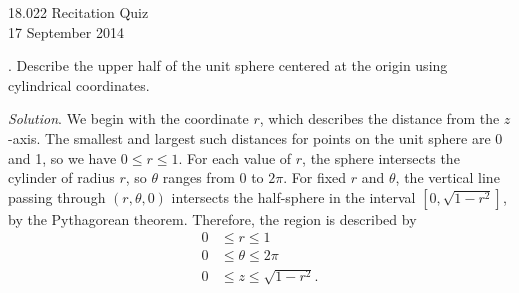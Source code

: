 \documentclass[11pt]{article}
\theoremstyle{definition}
\newcounter{prob}
\newcommand\itm{\theprob.  \stepcounter{prob}}
\newcommand\sol[2]{\textit{Solution}. #1}
\newcommand\sol[2]{#2}
\begin{document}
\thispagestyle{empty}

\begin{center}
  18.022 Recitation Quiz \iftoggle{solutions}{(with solutions)}{} \\
  17 September 2014 \\
\end{center}

\itm Describe the upper half of the unit sphere centered at the origin
using cylindrical coordinates. 

\sol{We begin with the coordinate $r$, which describes the distance from
  the $z$-axis. The smallest and largest such distances for points on the
  unit sphere are 0 and 1, so we have $0\leq r \leq 1$. For each value of
  $r$, the sphere intersects the cylinder of radius $r$, so $\theta$ ranges
  from $0$ to $2\pi$. For fixed $r$ and $\theta$, the vertical line passing
  through $(r,\theta,0)$ intersects the half-sphere in the interval
  $\left[0,\sqrt{1-r^2}\right]$, by the Pythagorean theorem. Therefore, the
  region is described by
  \begin{align*}
    0 &\leq r \leq 1 \\
    0 &\leq \theta \leq 2\pi \\
    0 &\leq z \leq \sqrt{1-r^2}. 
  \end{align*}
}{}
\end{document}
